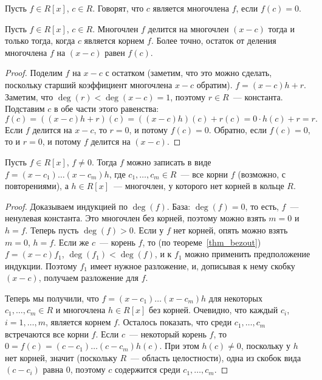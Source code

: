 \begin{definition}
Пусть $f\in R[x]$, $c\in R$. Говорят, что $c$ является
многочлена $f$, если $f(c)=0$.
\end{definition}

\begin{theorem}\label{thm_bezout}
Пусть $f\in R[x]$, $c\in R$.
Многочлен $f$ делится на многочлен $(x-c)$ тогда и только тогда, когда
$c$ является корнем $f$. Более точно, остаток от деления многочлена
$f$ на $(x-c)$ равен $f(c)$.
\end{theorem}
\begin{proof}
Поделим $f$ на $x-c$ с остатком (заметим, что это можно сделать,
поскольку старший коэффициент многочлена $x-c$ обратим).
$f = (x-c)h + r$. Заметим, что $\deg(r) < \deg(x-c) = 1$, поэтому
$r\in R$~--- константа. Подставим $c$ в обе части этого равенства:
$$f(c) = ((x-c)h + r)(c) = ((x-c)h)(c) + r(c) = 0\cdot h(c) + r = r.$$
Если $f$ делится на $x-c$, то $r=0$, и потому $f(c) = 0$. Обратно,
если $f(c) = 0$, то и $r=0$, и потому $f$ делится на $(x-c)$.
\end{proof}

\begin{proposition}\label{prop_linear_factors}
Пусть $f\in R[x]$, $f\neq 0$. Тогда $f$ можно записать в виде
$f=(x-c_1)\dots (x-c_m)h$, где $c_1,\dots,c_m\in R$~--- все корни $f$
(возможно, с повторениями), а $h\in R[x]$~---
многочлен, у которого нет корней в кольце $R$.
\end{proposition}
\begin{proof}
Доказываем индукцией по $\deg(f)$. База: $\deg(f)=0$, то есть, $f$~---
ненулевая константа. Это многочлен без корней, поэтому можно взять
$m=0$ и $h=f$. Теперь пусть $\deg(f)>0$. Если у $f$ нет корней, опять
можно взять $m=0$, $h=f$. Если же $c$~--- корень $f$, то (по
теореме~\ref{thm_bezout}) $f=(x-c)f_1$, $\deg(f_1)<\deg(f)$, и к
$f_1$ можно
применить предположение индукции. Поэтому $f_1$ имеет нужное
разложение, и, дописывая к нему скобку $(x-c)$, получаем разложение
для $f$.

Теперь мы получили, что $f = (x-c_1)\dots (x-c_m)h$ для некоторых
$c_1,\dots,c_m\in R$ и многочлена $h\in R[x]$ без корней.
Очевидно, что каждый $c_i$, $i=1,\dots,m$, является корнем
$f$. Осталось показать, что среди $c_1,\dots,c_m$ встречаются все
корни $f$. Если $c$~--- некоторый корень $f$, то
$0=f(c)=(c-c_1)\dots(c-c_m)h(c)$. При этом $h(c)\neq 0$, поскольку у
$h$ нет корней, значит (поскольку $R$~--- область целостности),
одна из скобок вида $(c-c_i)$ равна $0$,
поэтому $c$ содержится среди $c_1,\dots,c_m$.
\end{proof}

